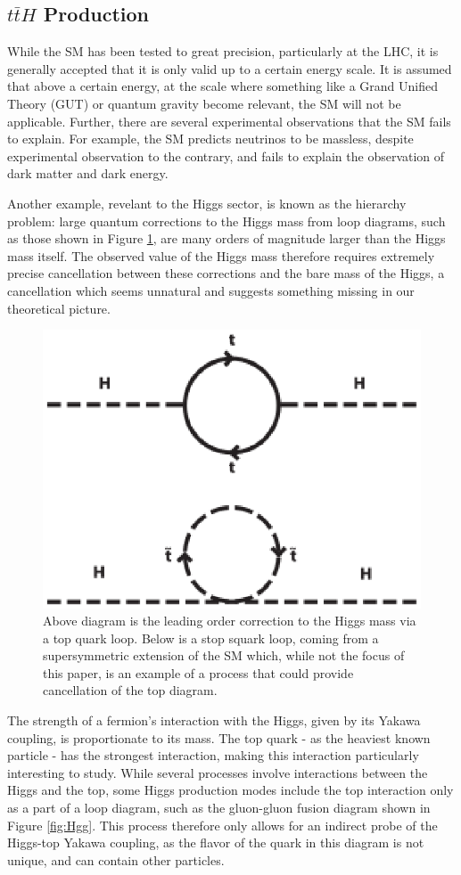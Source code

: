 \subsection{$t\bar{t}H$ Production}
\label{sec:ttH_theory}

While the SM has been tested to great precision, particularly at the LHC, it is generally accepted that it is only valid up to a certain energy scale. It is assumed that above a certain energy, at the scale where something like a Grand Unified Theory (GUT) or quantum gravity become relevant, the SM will not be applicable. Further, there are several experimental observations that the SM fails to explain. For example, the SM predicts neutrinos to be massless, despite experimental observation to the contrary, and fails to explain the observation of dark matter and dark energy.

Another example, revelant to the Higgs sector, is known as the hierarchy problem: large quantum corrections to the Higgs mass from loop diagrams, such as those shown in Figure \ref{fig:hierarchyDiagram}, are many orders of magnitude larger than the Higgs mass itself. The observed value of the Higgs mass therefore requires extremely precise cancellation between these corrections and the bare mass of the Higgs, a cancellation which seems unnatural and suggests something missing in our theoretical picture.

\begin{figure}[H]
\centering
   \includegraphics[width=0.5\linewidth]{figures/theory/hierarchyDiagram.eps}
\caption{Above diagram is the leading order correction to the Higgs mass via a top quark loop. Below is a stop squark loop, coming from a supersymmetric extension of the SM which, while not the focus of this paper, is an example of a process that could provide cancellation of the top diagram.}
\label{fig:hierarchyDiagram}
\end{figure}

The strength of a fermion's interaction with the Higgs, given by its Yakawa coupling, is proportionate to its mass. The top quark - as the heaviest known particle - has the strongest interaction, making this interaction particularly interesting to study. While several processes involve interactions between the Higgs and the top, some Higgs production modes include the top interaction only as a part of a loop diagram, such as the gluon-gluon fusion diagram shown in Figure \ref{fig:Hgg}. This process therefore only allows for an indirect probe of the Higgs-top Yakawa coupling, as the flavor of the quark in this diagram is not unique, and can contain other particles.

